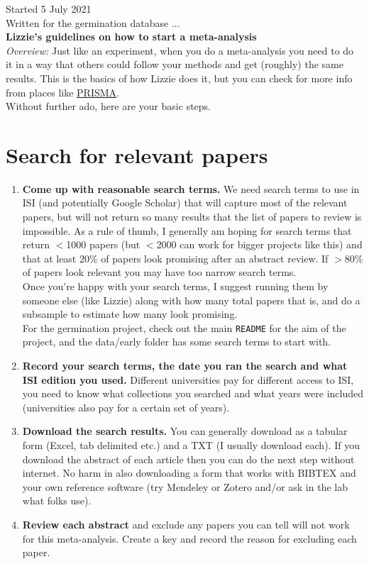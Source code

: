 \documentclass{article}[11pt]
\begin{document}
Started 5 July 2021\\
Written for the germination database ...\\

{\bf Lizzie's guidelines on how to start a meta-analysis}\\


\emph{Overview:} Just like an experiment, when you do a meta-analysis you need to do it in a way that others could follow your methods and get (roughly) the same results. This is the basics of how Lizzie does it, but you can check for more info from places like \href{http://www.prisma-statement.org/}{PRISMA}.\\

Without further ado, here are your basic steps.

\section{Search for relevant papers}

\begin{enumerate}
\item {\bf Come up with reasonable search terms.} We need search terms to use in ISI (and potentially Google Scholar) that will capture most of the relevant papers, but will not return so many results that the list of papers to review is impossible. As a rule of thumb, I generally am hoping for search terms that return $<$1000 papers (but $<$2000 can work for bigger projects like this) and that at least 20\% of papers look promising after an abstract review. If $>$80\% of papers look relevant you may have too narrow search terms. 
\vspace{1ex}\\
Once you're happy with your search terms, I suggest running them by someone else (like Lizzie) along with how many total papers that is, and do a subsample to estimate how many look promising. 
\vspace{1ex}\\
For the germination project, check out the main \verb|README| for the aim of the project, and the data/early folder has some search terms to start with. 
\item {\bf Record your search terms, the date you ran the search and what ISI edition you used.} Different universities pay for different access to ISI, you need to know what collections you searched and what years were included (universities also pay for a certain set of years). 
\item{\bf Download the search results.} You can generally download as a tabular form (Excel, tab delimited etc.) and a TXT (I usually download each). If you download the abstract of each article then you can do the next step without internet. No harm in also downloading a form that works with BIBTEX and your own reference software (try Mendeley or Zotero and/or ask in the lab what folks use). 
\item {\bf Review each abstract} and exclude any papers you can tell will not work for this meta-analysis. Create a key and record the reason for excluding each paper. 
\end{enumerate}
\end{document}
